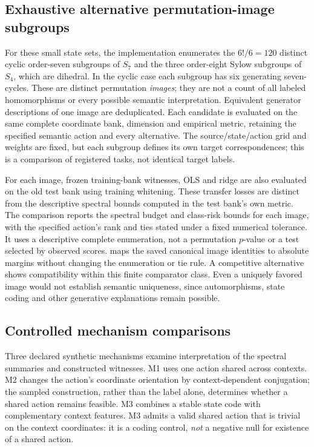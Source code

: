 \subsection{Exhaustive alternative permutation-image subgroups}
For these small state sets, the implementation enumerates the $6!/6=120$ distinct cyclic order-seven subgroups of $S_7$ and the three order-eight Sylow subgroups of $S_4$, which are dihedral. In the cyclic case each subgroup has six generating seven-cycles. These are distinct permutation \emph{images}; they are not a count of all labeled homomorphisms or every possible semantic interpretation. Equivalent generator descriptions of one image are deduplicated. Each candidate is evaluated on the same complete coordinate bank, dimension and empirical metric, retaining the specified semantic action and every alternative. The source/state/action grid and weights are fixed, but each subgroup defines its own target correspondences; this is a comparison of registered tasks, not identical target labels.

For each image, frozen training-bank witnesses, OLS and ridge are also evaluated on the old test bank using training whitening. These transfer losses are distinct from the descriptive spectral bounds computed in the test bank's own metric. The comparison reports the spectral budget and class-risk bounds for each image, with the specified action's rank and ties stated under a fixed numerical tolerance. It uses a descriptive complete enumeration, not a permutation $p$-value or a test selected by observed scores.  maps the saved canonical image identities to absolute margins without changing the enumeration or tie rule. A competitive alternative shows compatibility within this finite comparator class. Even a uniquely favored image would not establish semantic uniqueness, since automorphisms, state coding and other generative explanations remain possible.

\subsection{Controlled mechanism comparisons}
Three declared synthetic mechanisms examine interpretation of the spectral summaries and constructed witnesses. M1 uses one action shared across contexts. M2 changes the action's coordinate orientation by context-dependent conjugation; the sampled construction, rather than the label alone, determines whether a shared action remains feasible. M3 combines a stable state code with complementary context features. M3 admits a valid shared action that is trivial on the context coordinates: it is a coding control, \emph{not} a negative null for existence of a shared action.

